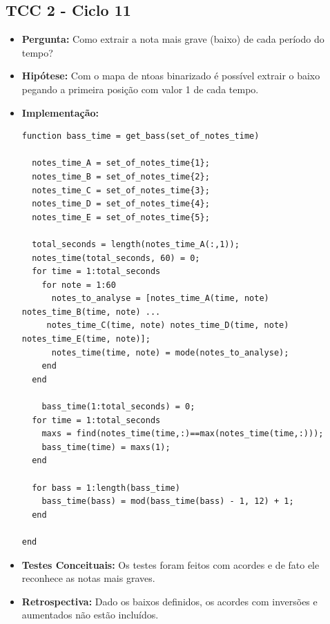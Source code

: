 \subsection{TCC 2 - Ciclo 11}
\begin{itemize}
\item \textbf{Pergunta:} Como extrair a nota mais grave (baixo) de cada período do tempo?
\item \textbf{Hipótese:} Com o mapa de ntoas binarizado é possível extrair o baixo pegando a primeira posição com valor 1 de cada tempo.
\item \textbf{Implementação:}
\begin{lstlisting}
function bass_time = get_bass(set_of_notes_time)

  notes_time_A = set_of_notes_time{1};
  notes_time_B = set_of_notes_time{2};
  notes_time_C = set_of_notes_time{3};
  notes_time_D = set_of_notes_time{4};
  notes_time_E = set_of_notes_time{5};

  total_seconds = length(notes_time_A(:,1));
  notes_time(total_seconds, 60) = 0;
  for time = 1:total_seconds
    for note = 1:60
      notes_to_analyse = [notes_time_A(time, note) notes_time_B(time, note) ...
     notes_time_C(time, note) notes_time_D(time, note) notes_time_E(time, note)];
      notes_time(time, note) = mode(notes_to_analyse);
    end
  end

    bass_time(1:total_seconds) = 0;
  for time = 1:total_seconds
    maxs = find(notes_time(time,:)==max(notes_time(time,:)));
    bass_time(time) = maxs(1);
  end

  for bass = 1:length(bass_time)
    bass_time(bass) = mod(bass_time(bass) - 1, 12) + 1;
  end

end
\end{lstlisting}
\item \textbf{Testes Conceituais:} Os testes foram feitos com acordes e de fato ele reconhece as notas mais graves.
\item \textbf{Retrospectiva:} Dado os baixos definidos, os acordes com inversões e aumentados não estão incluídos.
\end{itemize}


